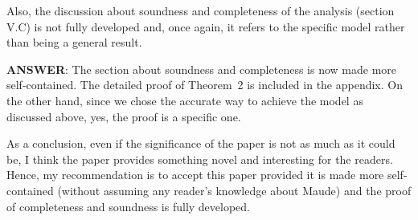 \documentclass[10pt,journal]{IEEEtran}
\newcommand{\ANSWER}{{\bf ANSWER}}
\begin{document}
Also, the discussion about soundness and
completeness of the analysis (section V.C) is not fully developed and,
once again, it refers to the specific model rather than being a
general result.

\ANSWER: The section about soundness and completeness is now made more
self-contained. The detailed proof of Theorem~2 is included in the
appendix. On the other hand, since we chose the accurate way to
achieve the model as discussed above, yes, the proof is a specific
one.

As a conclusion, even if the significance of the paper is not as much
as it could be, I think the paper provides something novel and
interesting for the readers. Hence, my recommendation is to accept
this paper provided it is made more self-contained (without assuming
any reader's knowledge about Maude) and the proof of completeness and
soundness is fully developed.
\end{document}
